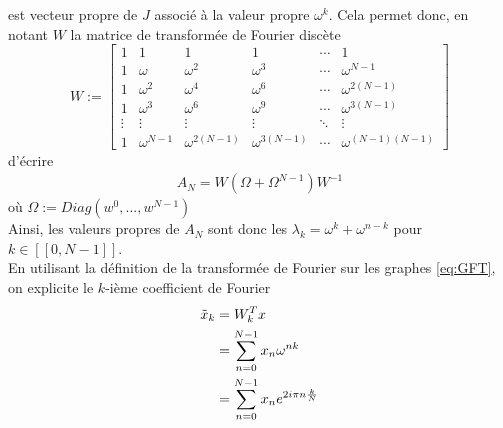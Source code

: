 \documentclass[11pt]{article}
\begin{document}
est vecteur propre de $J$ associé à la valeur propre $\omega^k$.
Cela permet donc, en notant $W$ la matrice de transformée de Fourier discète
\[ W :=
\begin{bmatrix}
1&1&1&1&\cdots &1 \\
1&\omega&\omega^2&\omega^3&\cdots&\omega^{N-1} \\
1&\omega^2&\omega^4&\omega^6&\cdots&\omega^{2(N-1)}\\ 1&\omega^3&\omega^6&\omega^9&\cdots&\omega^{3(N-1)}\\
\vdots&\vdots&\vdots&\vdots&\ddots&\vdots\\
1&\omega^{N-1}&\omega^{2(N-1)}&\omega^{3(N-1)}&\cdots&\omega^{(N-1)(N-1)}
\end{bmatrix}
\]
d'écrire
\begin{align}
    A_N = W(\Omega+\Omega^{N-1})W^{-1}
\end{align}
où $\Omega := Diag(w^0,...,w^{N-1})$\\
Ainsi, les valeurs propres de $A_N$ sont donc les $\lambda_k = \omega^k+\omega^{n-k}$ pour $k \in [\![0,N-1]\!]$.\\
En utilisant la définition de la transformée de Fourier sur les graphes \ref{eq:GFT}, on explicite le $k$-ième coefficient de Fourier
\begin{align}
    \Tilde{x}_k &= W_k^Tx\\
    &= \sum_{n=0}^{N-1}x_n\omega^{nk} \\
    &= \sum_{n=0}^{N-1}x_n e^{2i\pi n\frac{k}{N}}
\end{align}
\end{document}
